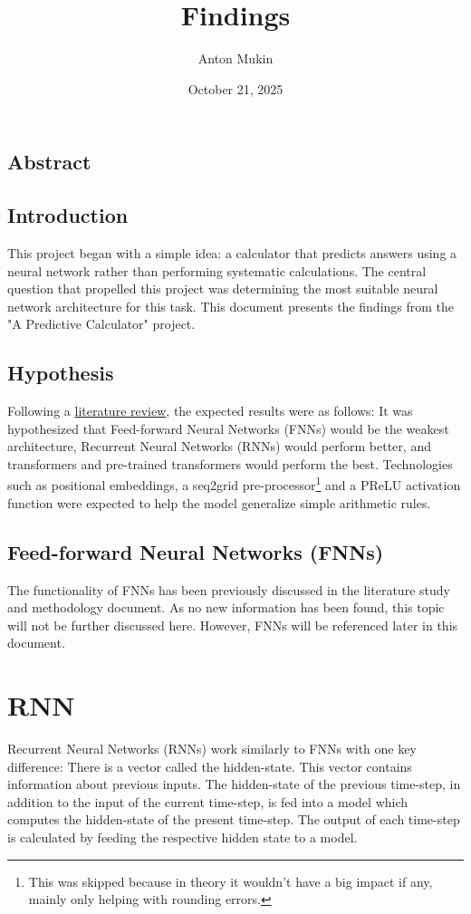 \documentclass{article}
\title{Findings}
\author{Anton Mukin}
\date{October 21, 2025}
\begin{document}
\maketitle

\subsection{Abstract}

\subsection{Introduction}
This project began with a simple idea: a calculator that predicts answers using a neural network rather than performing systematic calculations. The central question that propelled this project was determining the most suitable neural network architecture for this task. This document presents the findings from the "A Predictive Calculator" project.

\subsection{Hypothesis}
Following a \href{https://github.com/AntonStantan/matura/blob/main/zwischenProdukt/LiteraturstudieAnton.pdf}{literature review}, the expected results were as follows: 
It was hypothesized that Feed-forward Neural Networks (FNNs) would be the weakest architecture, Recurrent Neural Networks (RNNs) would perform better, and transformers and pre-trained transformers would perform the best. Technologies such as positional embeddings, a seq2grid pre-processor\footnote{This was skipped because in theory it wouldn't have a big impact if any, mainly only helping with rounding errors.} and a PReLU activation function were expected to help the model generalize simple arithmetic rules.


\newpage
\tableofcontents
\newpage

\subsection{Feed-forward Neural Networks (FNNs)}
The functionality of FNNs has been previously discussed in the literature study and methodology document. As no new information has been found, this topic will not be further discussed here. However, FNNs will be referenced later in this document.

\section{RNN}
Recurrent Neural Networks (RNNs) work similarly to FNNs with one key difference: There is a vector called the hidden-state. This vector contains information about previous inputs. The hidden-state of the previous time-step, in addition to the input of the current time-step, is fed into a model which computes the hidden-state of the present time-step. The output of each time-step is calculated by feeding the respective hidden state to a model.
\end{document}
